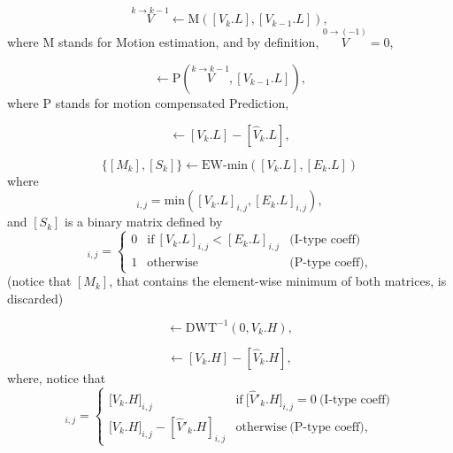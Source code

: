 \begin{equation}
  \overset{k\rightarrow k-1}{V} \leftarrow \text{M}([V_k.L], [V_{k-1}.L]),
  \tag{E.c}
\end{equation}
where M stands for Motion estimation, and by definition,
$\overset{0\rightarrow (-1)}{V}=0$,

\begin{equation}
  [\hat{V}_k.L] \leftarrow \text{P}(\overset{k\rightarrow k-1}{V}, [V_{k-1}.L]),
  \tag{E.d}
\end{equation}
where P stands for motion compensated Prediction,

\begin{equation}
  [E_k.L] \leftarrow [V_k.L] - [\hat{V}_k.L],
  \tag{E.e}
\end{equation}

\begin{equation}
  \{[M_k],[S_k]\} \leftarrow \text{EW-min}([V_k.L], [E_k.L])
  \tag{E.f}
\end{equation}
where
\begin{equation}
  [M_k]_{i,j}=\text{min}([V_k.L]_{i,j}, [E_k.L]_{i,j}),
\end{equation}
and $[S_k]$ is a binary matrix defined by
\begin{equation}
  [S_k]_{i,j} = \left\{
  \begin{array}{lll}
    0 & \text{if}~[V_k.L]_{i,j} < [E_k.L]_{i,j} & \text{(I-type coeff)} \\
    1 & \text{otherwise}                      & \text{(P-type coeff)},
  \end{array}
  \right.
  \label{eq:matrix}
\end{equation}
(notice that $[M_k]$, that contains the element-wise minimum of both
matrices, is discarded)

\begin{equation}
  [V_k.H] \leftarrow \text{DWT}^{-1}(0, V_k.H),
  \tag{b}
\end{equation}

\begin{equation}
  [E_k.H] \leftarrow [V_k.H] - [\hat{V}_k.H],
  \tag{c}
\end{equation}
where, notice that
\begin{equation}
  [E_k.H]_{i,j} = \left\{
  \begin{array}{ll}
    {[}V_k.H{]}_{i,j}                       & \text{if}~{[}\hat{V}'_k.H{]}_{i,j} = 0~\text{(I-type coeff)} \\
    {[}V_k.H{]}_{i,j} - [\hat{V}'_k.H]_{i,j} & \text{otherwise}~\text{(P-type coeff)},
  \end{array}
\right.
\end{equation}

